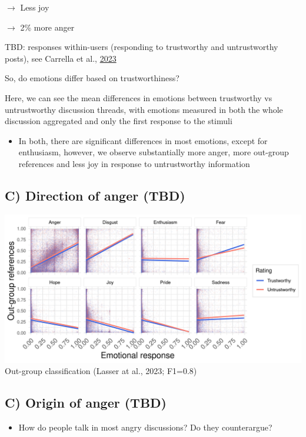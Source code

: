 \documentclass[
  letterpaper,
  DIV=11,
  numbers=noendperiod]{scrartcl}
\providecommand{\tightlist}{%
  \setlength{\itemsep}{0pt}\setlength{\parskip}{0pt}}\usepackage{longtable,booktabs,array}
\begin{document}
\(\rightarrow\) Less joy

\(\rightarrow\) 2\% more anger

TBD: responses within-users (responding to trustworthy and untrustworthy
posts), see Carrella et al., \href{https://osf.io/qx34w}{2023}

So, do emotions differ based on trustworthiness?

Here, we can see the mean differences in emotions between trustworthy vs
untrustworthy discussion threads, with emotions measured in both the
whole discussion aggregated and only the first response to the stimuli

\begin{itemize}
\tightlist
\item
  In both, there are significant differences in most emotions, except
  for enthusiasm, however, we observe substantially more anger, more
  out-group references and less joy in response to untrustworthy
  information
\end{itemize}

\hypertarget{c-direction-of-anger-tbd}{%
\subsection{C) Direction of anger
(TBD)}\label{c-direction-of-anger-tbd}}

\includegraphics[width=20.83333in,height=\textheight]{images/emotion_outgroup_facet.png}
Out-group classification (Lasser at al., 2023; F1=0.8)

\hypertarget{c-origin-of-anger-tbd}{%
\subsection{C) Origin of anger (TBD)}\label{c-origin-of-anger-tbd}}

\begin{itemize}
\tightlist
\item
  How do people talk in most angry discussions? Do they counterargue?
\end{itemize}
\end{document}
